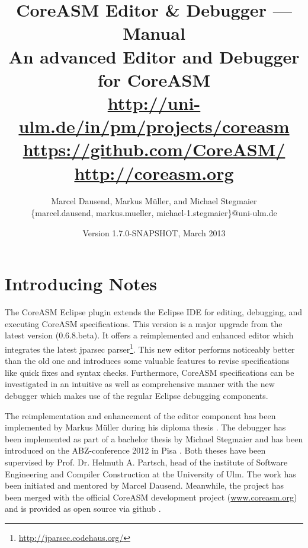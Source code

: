 \documentclass[10pt,oneside,a4paper]{article}
\begin{document}
\title{
	CoreASM Editor \& Debugger --- Manual
	\vspace{.5cm}\\
	\huge An advanced Editor and Debugger\\for CoreASM\\%
	\vspace{.5cm}
	\normalsize
	\url{http://uni-ulm.de/in/pm/projects/coreasm}\\
	\url{https://github.com/CoreASM/}\\
	\url{http://coreasm.org}
}

\author{Marcel Dausend, Markus Müller, and Michael Stegmaier\\ \ttfamily \small \{marcel.dausend, markus.mueller, michael-1.stegmaier\}@uni-ulm.de}
\date{Version 1.7.0-SNAPSHOT, March 2013}%

\maketitle
\vfill
\section{Introducing Notes}
The CoreASM Eclipse plugin extends the Eclipse IDE for editing, debugging, and executing CoreASM specifications. This version is a major upgrade from the latest version (0.6.8.beta). It offers a reimplemented and enhanced editor which integrates the latest jparsec parser\footnote{\url{http://jparsec.codehaus.org/}}. This new editor performs noticeably better than the old one and introduces some valuable features to revise specifications like quick fixes and syntax checks. Furthermore, CoreASM specifications can be investigated in an intuitive as well as comprehensive manner with the new debugger which makes use of the regular Eclipse debugging components.

The reimplementation and enhancement of the editor component has been implemented by Markus Müller during his diploma thesis \cite{Mueller2012}. The debugger has been implemented as part of a bachelor thesis by Michael Stegmaier \cite{Stegmaier2012} and has been introduced on the ABZ-conference 2012 in Pisa \cite{Dausend.Stegmaier.ea2012}. Both theses have been supervised by Prof. Dr. Helmuth A. Partsch, head of the institute of Software Engineering and Compiler Construction at the University of Ulm. The work has been initiated and mentored by Marcel Dausend. Meanwhile, the project has been merged with the official CoreASM development project (\url{www.coreasm.org}) and is provided as open source via github \cite{Dausend.Farahbod.ea2012}.
\end{document}
